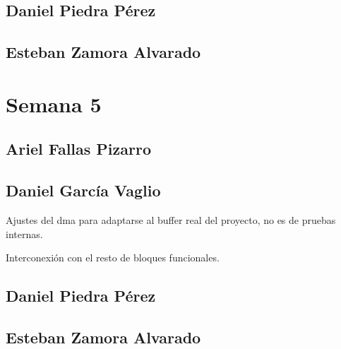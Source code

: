 \subsection{Daniel Piedra Pérez}


\subsection{Esteban Zamora Alvarado}

\newpage

\section{Semana 5}
\subsection{Ariel Fallas Pizarro}


\subsection{Daniel García Vaglio}
\item Ajustes del dma para adaptarse al buffer real del proyecto, no es de pruebas internas.
\item Interconexión con el resto de bloques funcionales. 

\subsection{Daniel Piedra Pérez}


\subsection{Esteban Zamora Alvarado}

\newpage



